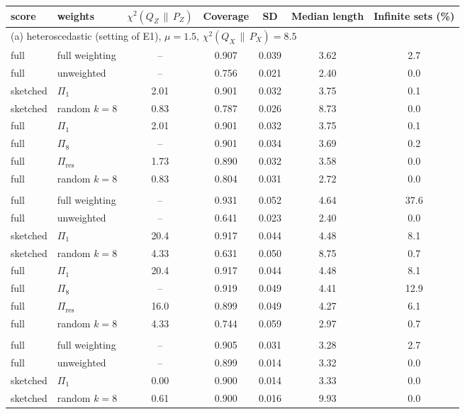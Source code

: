\documentclass[11pt,a4paper]{article}
\newcommand{\PX}{P_X}
\newcommand{\QX}{Q_X}
\newcommand{\chisq}{\chi^2(\QX\,\|\,\PX)}
\newcommand{\chisqZ}{\chi^2(Q_Z\,\|\,P_Z)}
\theoremstyle{plain}
\theoremstyle{definition}
\theoremstyle{remark}
\begin{document}
\begin{table}[!htbp]\centering\footnotesize\setlength{\tabcolsep}{5pt}
\begin{tabular}{llccccc}
\toprule
score & weights & $\chisqZ$ & Coverage & SD & Median length & Infinite sets (\%)\\
\midrule
\multicolumn{7}{l}{(a) heteroscedastic (setting of E1), $\mu=1.5$, $\chisq=8.5$}\\
full & full weighting & -- & 0.907 & 0.039 & 3.62 & 2.7\\
full & unweighted & -- & 0.756 & 0.021 & 2.40 & 0.0\\
sketched & $\Pi_1$ & 2.01 & 0.901 & 0.032 & 3.75 & 0.1\\
sketched & random $k=8$ & 0.83 & 0.787 & 0.026 & 8.73 & 0.0\\
full & $\Pi_1$ & 2.01 & 0.901 & 0.032 & 3.75 & 0.1\\
full & $\Pi_8$ & -- & 0.901 & 0.034 & 3.69 & 0.2\\
full & $\Pi_{\mathrm{res}}$ & 1.73 & 0.890 & 0.032 & 3.58 & 0.0\\
full & random $k=8$ & 0.83 & 0.804 & 0.031 & 2.72 & 0.0\\
\addlinespace
\multicolumn{7}{l}{(a) heteroscedastic, $\mu=2.5$, $\chisq=517$}\\
full & full weighting & -- & 0.931 & 0.052 & 4.64 & 37.6\\
full & unweighted & -- & 0.641 & 0.023 & 2.40 & 0.0\\
sketched & $\Pi_1$ & 20.4 & 0.917 & 0.044 & 4.48 & 8.1\\
sketched & random $k=8$ & 4.33 & 0.631 & 0.050 & 8.75 & 0.7\\
full & $\Pi_1$ & 20.4 & 0.917 & 0.044 & 4.48 & 8.1\\
full & $\Pi_8$ & -- & 0.919 & 0.049 & 4.41 & 12.9\\
full & $\Pi_{\mathrm{res}}$ & 16.0 & 0.899 & 0.049 & 4.27 & 6.1\\
full & random $k=8$ & 4.33 & 0.744 & 0.059 & 2.97 & 0.7\\
\addlinespace
\multicolumn{7}{l}{(b) homoscedastic (setting of E3), $\mu=1.5$, $\chisq=8.5$}\\
full & full weighting & -- & 0.905 & 0.031 & 3.28 & 2.7\\
full & unweighted & -- & 0.899 & 0.014 & 3.32 & 0.0\\
sketched & $\Pi_1$ & 0.00 & 0.900 & 0.014 & 3.33 & 0.0\\
sketched & random $k=8$ & 0.61 & 0.900 & 0.016 & 9.93 & 0.0\\

\end{tabular}
\end{table}
\end{document}

